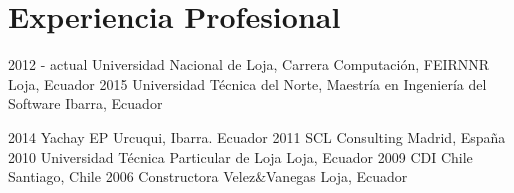 \documentclass[]{cv-style} %
\begin{document}
\section{Experiencia Profesional}
\vspace{-0.3cm}
\begin{entrylist}
\small
\entry
  {2012 - actual}
  {Universidad Nacional de Loja, Carrera Computación, FEIRNNR}
  {Loja, Ecuador}
  { }
\entry
  {2015}
  {Universidad Técnica del Norte, Maestría en Ingeniería del Software}
  {Ibarra, Ecuador}
  { }

\entry
  {2014}
  {Yachay EP}
  {Urcuqui, Ibarra. Ecuador}
  { }
\entry
  {2011}
  {SCL Consulting}
  {Madrid, España}
  { }
 \entry
  {2010}
  {Universidad Técnica Particular de Loja}
  {Loja, Ecuador}
  { }
 \entry
  {2009}
  {CDI Chile}
  {Santiago, Chile}
  { }
\entry
  {2006}
  {Constructora Velez\&Vanegas }
  {Loja, Ecuador}
  { }
\end{entrylist}
\end{document}
